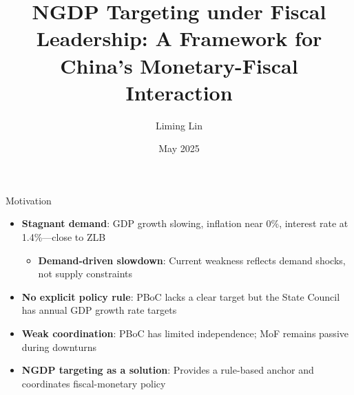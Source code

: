 \documentclass{beamer}
\title{NGDP Targeting under Fiscal Leadership: A Framework for China's Monetary-Fiscal Interaction}
\author{Liming Lin}
\institute{Sciences Po Paris}
\date{May 2025}
\begin{document}
\begin{frame}
  \titlepage
\end{frame}

\begin{frame}{Motivation}
  \begin{itemize}
    \item \textbf{Stagnant demand}: GDP growth slowing, inflation near 0\%, interest rate at 1.4\%—close to ZLB
    \begin{itemize}
     \item \textbf{Demand-driven slowdown}: Current weakness reflects demand shocks, not supply constraints
    \end{itemize}

    \item \textbf{No explicit policy rule}: PBoC lacks a clear target but the State Council has annual GDP growth rate targets
    \item \textbf{Weak coordination}: PBoC has limited independence; MoF remains passive during downturns
    \item \textbf{NGDP targeting as a solution}: Provides a rule-based anchor and coordinates fiscal-monetary policy
  \end{itemize}
\end{frame}
\end{document}
